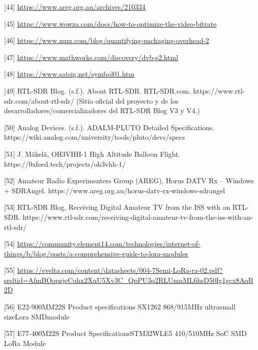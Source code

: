 \documentclass[12pt,a4paper]{article}
\begin{document}
{[}44{]} \href{https://www.areg.org.au/archives/210334}{\ul{https://www.areg.org.au/archives/210334}}

{[}45{]} \href{https://www.wowza.com/docs/how-to-optimize-the-video-bitrate}{\ul{https://www.wowza.com/docs/how-to-optimize-the-video-bitrate}}

{[}46{]} \href{https://www.mux.com/blog/quantifying-packaging-overhead-2}{\ul{https://www.mux.com/blog/quantifying-packaging-overhead-2}}

{[}47{]} \href{https://www.mathworks.com/discovery/dvb-s2.html}{\ul{https://www.mathworks.com/discovery/dvb-s2.html}}

{[}48{]} \href{https://www.satsig.net/symbol01.htm}{\ul{https://www.satsig.net/symbol01.htm}}

{[}49{]} RTL-SDR Blog. (s.f.). About RTL-SDR. RTL-SDR.com. https://www.rtl-sdr.com/about-rtl-sdr/ (Sitio oficial del proyecto y de los desarrolladores/comercializadores del RTL-SDR Blog V3 y V4.)

{[}50{]} Analog Devices. (s.f.). ADALM-PLUTO Detailed Specifications. https://wiki.analog.com/university/tools/pluto/devs/specs

{[}51{]} J. Mäkelä, OH3VHH-1 High Altitude Balloon Flight. https://0xfeed.tech/projects/oh3vhh-1/

{[}52{]} Amateur Radio Experimenters Group (AREG), Horus DATV Rx -- Windows + SDRAngel. https://www.areg.org.au/horus-datv-rx-windows-sdrangel

{[}53{]} RTL-SDR Blog, Receiving Digital Amateur TV from the ISS with an RTL-SDR. https://www.rtl-sdr.com/receiving-digital-amateur-tv-from-the-iss-with-an-rtl-sdr/

{[}54{]} \href{https://community.element14.com/technologies/internet-of-things/b/blog/posts/a-comprehensive-guide-to-lora-modules}{\ul{https://community.element14.com/technologies/internet-of-things/b/blog/posts/a-comprehensive-guide-to-lora-modules}}

{[}55{]} \href{https://evelta.com/content/datasheets/004-7Semi-LoRa-ra-02.pdf?srsltid=AfmBOopzjeCuhx2XuU5Xv3C_QpPU3q2RLUmnML6hsD50Ig1gcx8AqB2D}{\ul{https://evelta.com/content/datasheets/004-7Semi-LoRa-ra-02.pdf?srsltid=AfmBOopzjeCuhx2XuU5Xv3C\_QpPU3q2RLUmnML6hsD50Ig1gcx8AqB2D}}

{[}56{]} E22-900MM22S Product specifications SX1262 868/915MHz ultrasmall sizeLora SMDmodule

{[}57{]} E77-400M22S Product SpecificationsSTM32WLE5 410/510MHz SoC SMD LoRa Module
\end{document}
